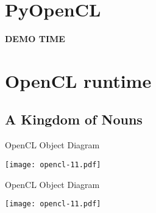 \documentclass[english,compress]{beamer}
\def\bigncentered#1{
  \begin{center}
    \Huge\bfseries #1
  \end{center}
}
\begin{document}
%

%
%

\section{PyOpenCL}
\begin{frame}
  \bigncentered{DEMO TIME}
\end{frame}
\section[Runtime]{OpenCL runtime}
\subsection{A Kingdom of Nouns}
\begin{frame}{OpenCL Object Diagram}
  \begin{center}
  \texttt{[image: opencl-11.pdf]}
  \end{center}
\end{frame}












\begin{frame}{OpenCL Object Diagram}
  \begin{center}
  \texttt{[image: opencl-11.pdf]}
  \end{center}
\end{frame}
\end{document}
